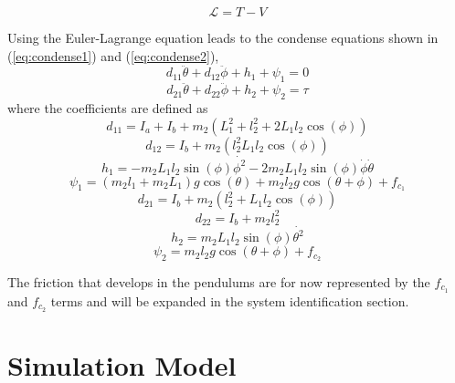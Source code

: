 \begin{equation} \label{eq:euler_lagrane}
\mathcal{L}=T-V
\end{equation}

Using the Euler-Lagrange equation leads to the condense equations shown in (\ref{eq:condense1}) and (\ref{eq:condense2}),
\begin{equation} \label{eq:condense1}
d_{11}\ddot{\theta}+d_{12}\ddot{\phi} + h_{1} + \psi_{1} = 0
\end{equation}
\begin{equation} \label{eq:condense2}
d_{21}\ddot{\theta} + d_{22}\ddot{\phi} + h_{2} + \psi_{2} = \tau
\end{equation}
where the coefficients are defined as
\begin{equation} \label{eq:d11}
d_{11} = I_{a} + I_{b} + m_{2}(L_{1}^2 + l_{2}^2+2L_{1}l_{2}\cos(\phi))
\end{equation}
\begin{equation} \label{eq:d12}
d_{12} = I_{b} +m_{2}(l_{2}^2 L_{1}l_{2}\cos(\phi))
\end{equation}
\begin{equation} \label{eq:h1}
h_{1} = -m_{2}L_{1}l_{2}\sin(\phi)\dot{\phi^2}-2m_{2}L_{1}l_{2}\sin(\phi)\dot{\phi}\dot{\theta}
\end{equation}
\begin{equation} \label{eq:psi1}
\psi_{1} = (m_{2}l_{1}+m_{2}L_{1})g\cos(\theta) + m_{2}l_{2}g\cos(\theta+\phi) + f_{c_{1}}
\end{equation}
\begin{equation} \label{eq:d21}
d_{21}= I_{b}+m_{2}(l_{2}^2+L_{1}l_{2}\cos(\phi))
\end{equation}
\begin{equation} \label{eq:d22}
d_{22}= I_{b}+ m_{2}l_{2}^2
\end{equation}
\begin{equation} \label{eq:h2}
h_{2}= m_{2}L_{1}l_{2}\sin(\phi)\dot{\theta^2}
\end{equation}
\begin{equation} \label{eq:psi2}
\psi_{2}= m_{2}l_{2}g\cos(\theta+\phi) + f_{c_{2}}
\end{equation}

The friction that develops in the pendulums are for now represented by the $f_{c_{1}}$ and $f_{c_{2}}$ terms and will be expanded in the system identification section.

\section{Simulation Model}
\label{sec:simulation_model}

